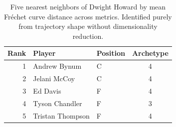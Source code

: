 \begin{table}[htbp]
  \centering\small
  \begin{tabular}{rllc}
    \toprule
    Rank & Player & Position & Archetype \\
    \midrule
    1 & Andrew Bynum & C & 4 \\
    2 & Jelani McCoy & C & 4 \\
    3 & Ed Davis & F & 4 \\
    4 & Tyson Chandler & F & 3 \\
    5 & Tristan Thompson & F & 4 \\
    \bottomrule
  \end{tabular}
  \caption{Five nearest neighbors of Dwight Howard by mean Fr\'{e}chet curve distance across metrics. Identified purely from trajectory shape without dimensionality reduction.}
  \label{tab:Dwight_Howard_frechet_curve_neighbors}
\end{table}

